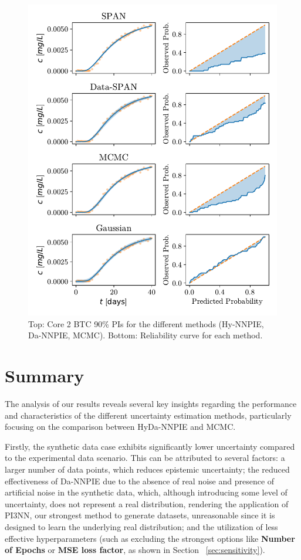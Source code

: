 \begin{figure}[h]
    \centering
    \includegraphics{figs/reliability_curves.pdf}
    \caption{Top: Core 2 BTC 90\% PIs for the different methods (Hy-NNPIE, Da-NNPIE, MCMC). Bottom: Reliability curve for each method.}
    \label{fig:reliability_curves}
\end{figure}


\section{Summary}
The analysis of our results reveals several key insights regarding the performance and characteristics of the different uncertainty estimation methods, particularly focusing on the comparison between HyDa-NNPIE and MCMC.

Firstly, the synthetic data case exhibits significantly lower uncertainty compared to the experimental data scenario. This can be attributed to several factors: a larger number of data points, which reduces epistemic uncertainty; the reduced effectiveness of Da-NNPIE due to the absence of real noise and presence of artificial noise in the synthetic data, which, although introducing some level of uncertainty, does not represent a real distribution, rendering the application of PI3NN, our strongest method to generate datasets, unreasonable since it is designed to learn the underlying real distribution; and the utilization of less effective hyperparameters (such as excluding the strongest options like \textbf{Number of Epochs} or \textbf{MSE loss factor}, as shown in Section ~\vref{sec:sensitivity}).

